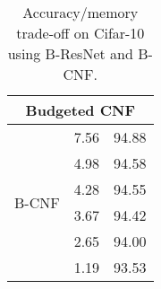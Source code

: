 \begin{table}[h!]
\begin{tabular}{|c||cc|}
\multicolumn{3}{|c|}{Budgeted CNF}                                 \\ \hline
\multirow{6}{*}{B-CNF}      & 7.56                 & 94.88         \\
                            & 4.98                 & 94.58         \\
                            & 4.28                 & 94.55         \\
                            & 3.67                 & 94.42         \\
                            & 2.65                 & 94.00         \\
                            & 1.19                 & 93.53         \\ \hline
\end{tabular}
\caption{Accuracy/memory trade-off on Cifar-10 using B-ResNet and B-CNF.}
\label{cif10_allmodels_params}
\end{table}